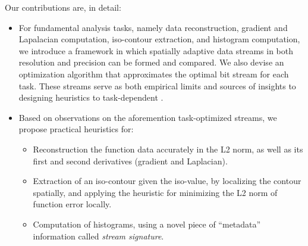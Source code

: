 Our contributions are, in detail:

\begin{itemize}
  \item For fundamental analysis tasks, namely data reconstruction, gradient and Lapalacian computation, iso-contour extraction, and histogram computation, we introduce a framework in which spatially adaptive data streams in both resolution and precision can be formed and compared. We also devise an optimization algorithm that approximates the optimal bit stream for each task. These streams serve as both empirical limits and sources of insights to designing heuristics to task-dependent .
  \item Based on observations on the aforemention task-optimized streams, we propose practical heuristics for:
  \begin{itemize}
    \item Reconstruction the function data accurately in the L2 norm, as well as its first and second derivatives (gradient and Laplacian).
    \item Extraction of an iso-contour given the iso-value, by localizing the contour spatially, and applying the heuristic for minimizing the L2 norm of function error locally.
    \item Computation of histograms, using a novel piece of ``metadata'' information called \emph{stream signature}.
  \end{itemize}
\end{itemize}
